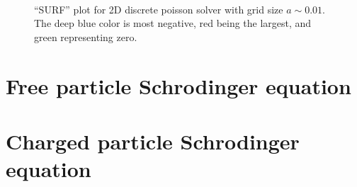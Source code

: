 \documentclass[singlepage,notitlepage,nofootinbib,11pt]{revtex4-1}
\begin{document}
\begin{figure}[h]
  \centering
  \captionsetup[subfigure]{labelformat=empty}
  \\
  \caption{\label{poissons} ``SURF'' plot for 2D discrete poisson solver with grid size $a\sim0.01$. The deep blue color is most negative, red being the largest, and green representing zero.}
\end{figure}

\clearpage
\section{Free particle Schrodinger equation}


\clearpage
\section{Charged particle Schrodinger equation}
\end{document}
